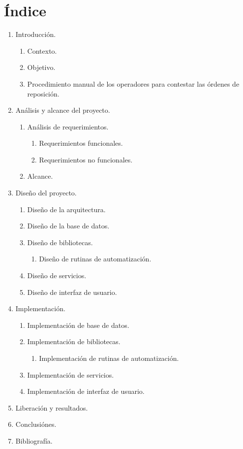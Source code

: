 \documentclass[a4paper,10pt]{article}
\begin{document}
\section{Índice}
\begin{enumerate}
  \item Introducción.
  \begin{enumerate}
    \item Contexto.
    \item Objetivo.
    \item Procedimiento manual de los operadores para contestar las órdenes de reposición.
  \end{enumerate}
  \item Análisis y alcance del proyecto.
  \begin{enumerate}
    \item Análisis de requerimientos.
    \begin{enumerate}
      \item Requerimientos funcionales.
      \item Requerimientos no funcionales.
    \end{enumerate}
    \item Alcance.
  \end{enumerate}
\item Diseño del proyecto.
\begin{enumerate}
  \item Diseño de la arquitectura.
  \item Diseño de la base de datos.
  \item Diseño de bibliotecas.
  \begin{enumerate}
    \item Diseño de rutinas de automatización.
  \end{enumerate}
  \item Diseño de servicios.
  \item Diseño de interfaz de usuario.
\end{enumerate}
\item Implementación.
\begin{enumerate}
  \item Implementación de base de datos.
  \item Implementación de bibliotecas.
  \begin{enumerate}
    \item Implementación de rutinas de automatización.
  \end{enumerate}
  \item Implementación de servicios.
  \item Implementación de interfaz de usuario.
\end{enumerate}
\item Liberación y resultados.
\item Conclusiónes.
\item Bibliografía.
\end{enumerate}
\end{document}
